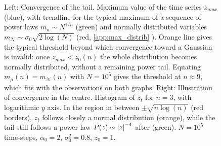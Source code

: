 \documentclass[FinalReport.tex]{subfiles}
\begin{document}
\begin{figure}[h!]
	\centering
	\caption{Left: Convergence of the tail. Maximum value of the time series $z_{max}$ (blue), with trendline for the typical maximum of a sequence of power laws $m_n\sim N^{1/n}$ (green) and normally distributed variables $m_\mathcal{N}\sim \sigma_0\sqrt{2\log(N)}$ (red, \autoref{app:max_distrib} ). Orange line gives the typical threshold beyond which convergence toward a Gaussian is invalid: once $z_{max}<z_0(n)$ the whole distribution becomes normally distributed, without a remaining power tail. Equating $m_\mu(n)=m_\mathcal{N}(n)$ with $N=10^5$ gives the threshold at $n\approx9$, which fits with the observations on both graphs. 
	Right: Illustration of convergence in the centre. Histogram of $z_t$ for $n=3$, with logarithmic $y$ axis. In the region in between $\pm\sqrt{n\log(n)}$ (red borders), $z_t$ follows closely a normal distribution (orange), while the tail still follows a power law $P(z)\sim \abs{z}^{-4}$ after (green).
	$N=10^5$ time-steps, $\alpha_0=2$, $\sigma_0^2=0.8$, $z_0=1$.}
	\label{fig:max_exp_n}
\end{figure}
\end{document}

